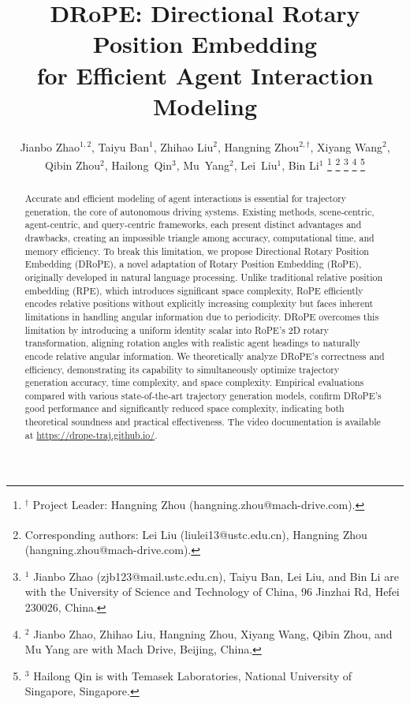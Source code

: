 \documentclass[lettersize,journal]{IEEEtran}
\theoremstyle{definition}
\begin{document}
\title{DRoPE: Directional Rotary Position Embedding \\for Efficient Agent Interaction Modeling}


\author{
    Jianbo Zhao$^{1,2}$, Taiyu Ban$^{1}$, Zhihao Liu$^{2}$, Hangning Zhou$^{2,\dagger}$\textsuperscript{\Letter}, Xiyang Wang$^{2}$, Qibin Zhou$^{2}$, Hailong~Qin$^{3}$, Mu~Yang$^{2}$, Lei~Liu$^{1}$\textsuperscript{\Letter}, Bin Li$^{1}$
    \thanks{$^\dagger$ Project Leader: Hangning Zhou (hangning.zhou@mach-drive.com).}
    \thanks{\textsuperscript{\Letter} Corresponding authors: Lei Liu (liulei13@ustc.edu.cn), Hangning Zhou (hangning.zhou@mach-drive.com).}
    \thanks{$^1$ Jianbo Zhao (zjb123@mail.ustc.edu.cn), Taiyu Ban, Lei Liu, and Bin Li are with the University of Science and Technology of China, 96 Jinzhai Rd, Hefei 230026, China.}
    \thanks{$^2$ Jianbo Zhao, Zhihao Liu, Hangning Zhou, Xiyang Wang, Qibin Zhou, and Mu Yang are with Mach Drive, Beijing, China.}
    \thanks{$^3$ Hailong Qin is with Temasek Laboratories, National University of Singapore, Singapore.}
}




\maketitle



\begin{abstract}
Accurate and efficient modeling of agent interactions is essential for trajectory generation, the core of autonomous driving systems. Existing methods, scene-centric, agent-centric, and query-centric frameworks, each present distinct advantages and drawbacks, creating an impossible triangle among accuracy, computational time, and memory efficiency. To break this limitation, we propose Directional Rotary Position Embedding (DRoPE), a novel adaptation of Rotary Position Embedding (RoPE), originally developed in natural language processing. Unlike traditional relative position embedding (RPE), which introduces significant space complexity, RoPE efficiently encodes relative positions without explicitly increasing complexity but faces inherent limitations in handling angular information due to periodicity. DRoPE overcomes this limitation by introducing a uniform identity scalar into RoPE's 2D rotary transformation, aligning rotation angles with realistic agent headings to naturally encode relative angular information. We theoretically analyze DRoPE's correctness and efficiency, demonstrating its capability to simultaneously optimize trajectory generation accuracy, time complexity, and space complexity. Empirical evaluations compared with various state-of-the-art trajectory generation models, confirm DRoPE's good performance and significantly reduced space complexity, indicating both theoretical soundness and practical effectiveness. The video documentation is available at \url{https://drope-traj.github.io/}.
\end{abstract}
\end{document}
